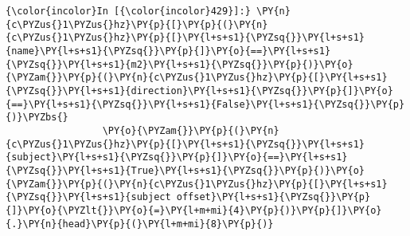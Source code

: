     \begin{Verbatim}[commandchars=\\\{\}]
{\color{incolor}In [{\color{incolor}429}]:} \PY{n}{c\PYZus{}1\PYZus{}hz}\PY{p}{[}\PY{p}{(}\PY{n}{c\PYZus{}1\PYZus{}hz}\PY{p}{[}\PY{l+s+s1}{\PYZsq{}}\PY{l+s+s1}{name}\PY{l+s+s1}{\PYZsq{}}\PY{p}{]}\PY{o}{==}\PY{l+s+s1}{\PYZsq{}}\PY{l+s+s1}{m2}\PY{l+s+s1}{\PYZsq{}}\PY{p}{)}\PY{o}{\PYZam{}}\PY{p}{(}\PY{n}{c\PYZus{}1\PYZus{}hz}\PY{p}{[}\PY{l+s+s1}{\PYZsq{}}\PY{l+s+s1}{direction}\PY{l+s+s1}{\PYZsq{}}\PY{p}{]}\PY{o}{==}\PY{l+s+s1}{\PYZsq{}}\PY{l+s+s1}{False}\PY{l+s+s1}{\PYZsq{}}\PY{p}{)}\PYZbs{}
                 \PY{o}{\PYZam{}}\PY{p}{(}\PY{n}{c\PYZus{}1\PYZus{}hz}\PY{p}{[}\PY{l+s+s1}{\PYZsq{}}\PY{l+s+s1}{subject}\PY{l+s+s1}{\PYZsq{}}\PY{p}{]}\PY{o}{==}\PY{l+s+s1}{\PYZsq{}}\PY{l+s+s1}{True}\PY{l+s+s1}{\PYZsq{}}\PY{p}{)}\PY{o}{\PYZam{}}\PY{p}{(}\PY{n}{c\PYZus{}1\PYZus{}hz}\PY{p}{[}\PY{l+s+s1}{\PYZsq{}}\PY{l+s+s1}{subject offset}\PY{l+s+s1}{\PYZsq{}}\PY{p}{]}\PY{o}{\PYZlt{}}\PY{o}{=}\PY{l+m+mi}{4}\PY{p}{)}\PY{p}{]}\PY{o}{.}\PY{n}{head}\PY{p}{(}\PY{l+m+mi}{8}\PY{p}{)}
\end{Verbatim}
